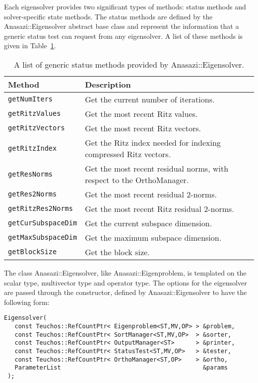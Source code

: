 Each eigensolver provides two significant types of methods: status methods and
solver-specific state methods. The status methods are defined by the Anasazi::Eigensolver
abstract base class and represent the information that a generic status test can request
from any eigensolver. A list of these methods is given in
Table~\ref{tab:anasazi:genstatusmethods}.

\begin{table}[htp]
\begin{center}
\begin{tabular}{| p{4cm} p{10cm} |}
\hline
Method & Description \\
\hline
{\tt getNumIters}       & Get the current number of iterations. \\
{\tt getRitzValues}     & Get the most recent Ritz values. \\
{\tt getRitzVectors}    & Get the most recent Ritz vectors. \\
{\tt getRitzIndex}      & Get the Ritz index needed for indexing compressed Ritz vectors. \\
{\tt getResNorms}       & Get the most recent residual norms, with respect to the OrthoManager. \\
{\tt getRes2Norms}      & Get the most recent residual 2-norms. \\
{\tt getRitzRes2Norms}  & Get the most recent Ritz residual 2-norms. \\
{\tt getCurSubspaceDim} & Get the current subspace dimension. \\
{\tt getMaxSubspaceDim} & Get the maximum subspace dimension. \\
{\tt getBlockSize}      & Get the block size. \\
\hline
\end{tabular}
\caption{A list of generic status methods provided by Anasazi::Eigensolver.}
\label{tab:anasazi:genstatusmethods}
\end{center}
\end{table}

The class Anasazi::Eigensolver, like Anasazi::Eigenproblem, is templated on the scalar
type, multivector type and operator type. The options for the eigensolver are passed
through the constructor, defined by Anasazi::Eigensolver to have the following form:
\begin{verbatim}
Eigensolver( 
   const Teuchos::RefCountPtr< Eigenproblem<ST,MV,OP> > &problem, 
   const Teuchos::RefCountPtr< SortManager<ST,MV,OP>  > &sorter,
   const Teuchos::RefCountPtr< OutputManager<ST>      > &printer,
   const Teuchos::RefCountPtr< StatusTest<ST,MV,OP>   > &tester,
   const Teuchos::RefCountPtr< OrthoManager<ST,OP>    > &ortho,
   ParameterList                                        &params  
 );
\end{verbatim}

